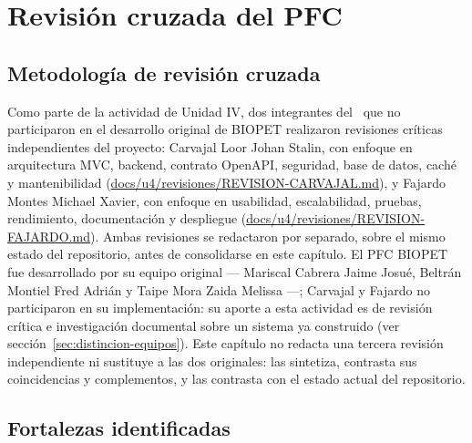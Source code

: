 \chapter{Revisi\'on cruzada del PFC}
\label{cap:revision-cruzada}

\section{Metodolog\'ia de revisi\'on cruzada}
\label{sec:revision-metodologia}

Como parte de la actividad de Unidad IV, dos integrantes del \equipoga\ que
no participaron en el desarrollo original de BIOPET realizaron revisiones
cr\'iticas independientes del proyecto: Carvajal Loor Johan Stalin, con
enfoque en arquitectura MVC, backend, contrato OpenAPI, seguridad, base de
datos, cach\'e y mantenibilidad
(\url{docs/u4/revisiones/REVISION-CARVAJAL.md}), y Fajardo Montes Michael
Xavier, con enfoque en usabilidad, escalabilidad, pruebas, rendimiento,
documentaci\'on y despliegue
(\url{docs/u4/revisiones/REVISION-FAJARDO.md}). Ambas revisiones se
redactaron por separado, sobre el mismo estado del repositorio, antes de
consolidarse en este cap\'itulo. El PFC BIOPET fue desarrollado por su
equipo original --- Mariscal Cabrera Jaime Josu\'e, Beltr\'an Montiel Fred
Adri\'an y Taipe Mora Zaida Melissa ---; Carvajal y Fajardo no participaron
en su implementaci\'on: su aporte a esta actividad es de revisi\'on cr\'itica
e investigaci\'on documental sobre un sistema ya construido (ver
secci\'on~\ref{sec:distincion-equipos}). Este cap\'itulo no redacta una
tercera revisi\'on independiente ni sustituye a las dos originales: las
sintetiza, contrasta sus coincidencias y complementos, y las contrasta con
el estado actual del repositorio.

\section{Fortalezas identificadas}
\label{sec:revision-fortalezas}

